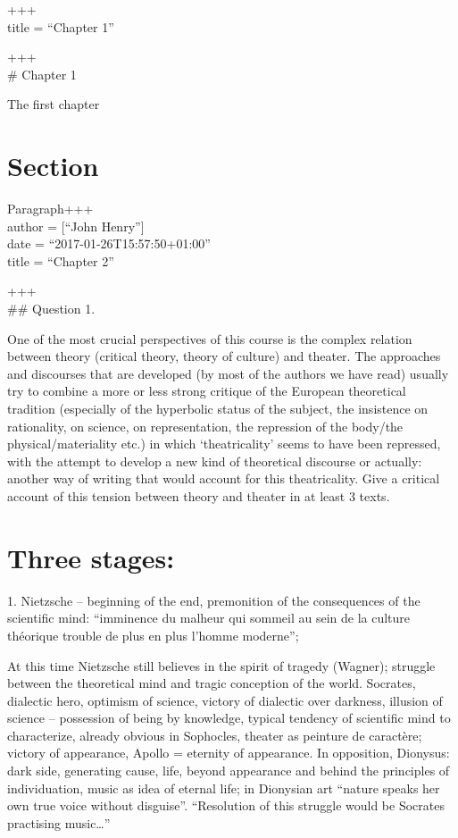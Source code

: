 \documentclass[oneside]{memoir}
\let\oldsection\section
\renewcommand\section{\clearpage\gdef\znewpage{\global\let\znewpage\clearpage}\oldsection}
\begin{document}
+++\\
title = ``Chapter 1''

+++\\
\# Chapter 1

The first chapter

\section{Section}\label{section}

Paragraph+++\\
author = {[}``John Henry''{]}\\
date = ``2017-01-26T15:57:50+01:00''\\
title = ``Chapter 2''

+++\\
\#\# Question 1.

One of the most crucial perspectives of this course is the complex
relation between theory (critical theory, theory of culture) and
theater. The approaches and discourses that are developed (by most of
the authors we have read) usually try to combine a more or less strong
critique of the European theoretical tradition (especially of the
hyperbolic status of the subject, the insistence on rationality, on
science, on representation, the repression of the body/the
physical/materiality etc.) in which `theatricality' seems to have been
repressed, with the attempt to develop a new kind of theoretical
discourse or actually: another way of writing that would account for
this theatricality. Give a critical account of this tension between
theory and theater in at least 3 texts.

\section{Three stages:}\label{three-stages}

1. Nietzsche -- beginning of the end, premonition of the consequences of
the scientific mind: ``imminence du malheur qui sommeil au sein de la
culture théorique trouble de plus en plus l'homme moderne'';

At this time Nietzsche still believes in the spirit of tragedy (Wagner);
struggle between the theoretical mind and tragic conception of the
world. Socrates, dialectic hero, optimism of science, victory of
dialectic over darkness, illusion of science -- possession of being by
knowledge, typical tendency of scientific mind to characterize, already
obvious in Sophocles, theater as peinture de caractère; victory of
appearance, Apollo = eternity of appearance. In opposition, Dionysus:
dark side, generating cause, life, beyond appearance and behind the
principles of individuation, music as idea of eternal life; in Dionysian
art ``nature speaks her own true voice without disguise''. ``Resolution
of this struggle would be Socrates practising music\ldots{}''
\end{document}

